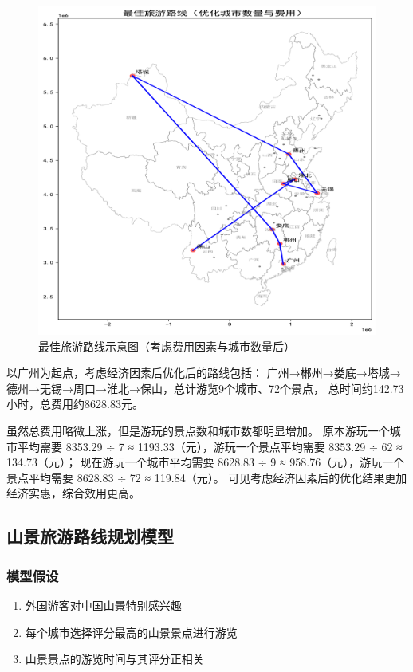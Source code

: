\documentclass[withoutpreface,bwprint]{cumcmthesis} %
\begin{document}
\begin{figure}[H]
    \centering
    \includegraphics[width=1.0\textwidth]{figures/image/4_optimal_route.png}
    \caption{最佳旅游路线示意图（考虑费用因素与城市数量后）}
    \label{fig:最佳旅游路线示意图（考虑费用因素与城市数量后）}
\end{figure}

以广州为起点，考虑经济因素后优化后的路线包括：
广州→郴州→娄底→塔城→德州→无锡→周口→淮北→保山，总计游览9个城市、72个景点，
总时间约142.73小时，总费用约8628.83元。

虽然总费用略微上涨，但是游玩的景点数和城市数都明显增加。
原本游玩一个城市平均需要 8353.29 ÷ 7 ≈ 1193.33（元），游玩一个景点平均需要 8353.29 ÷ 62 ≈ 134.73（元）；
现在游玩一个城市平均需要 8628.83 ÷ 9 ≈ 958.76（元），游玩一个景点平均需要 8628.83 ÷ 72 ≈ 119.84（元）。
可见考虑经济因素后的优化结果更加经济实惠，综合效用更高。






\subsection{山景旅游路线规划模型}

\subsubsection{模型假设}
\begin{enumerate}
    \item 外国游客对中国山景特别感兴趣
    \item 每个城市选择评分最高的山景景点进行游览
    \item 山景景点的游览时间与其评分正相关
\end{enumerate}
\end{document}
